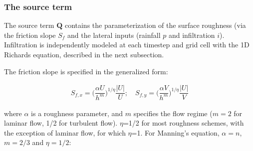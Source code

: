 \documentclass{article}
\newcommand{\code}[1]{\texttt{#1}}
\begin{document}

% 
%
%
%


\subsubsection*{The source term }

The source term $\mathbf{Q}$ contains the parameterization of the surface roughness (via the friction slope $S_f$  and the lateral inputs (rainfall $p$ and infiltration $i$).  Infiltration is independently modeled at each timestep and grid cell with the 1D Richards equation, described in the next subsection.
  
 The friction slope is specified in the generalized form: 

\begin{eqnarray} \nonumber
S_{f,x} = \bigg( \dfrac{\alpha  U}{h^m}\bigg)^{1/\eta} \dfrac{|U|}{U}; \quad
S_{f,y} = \bigg( \dfrac{\alpha  V}{h^m}\bigg)^{1/\eta} \dfrac{|U|}{V}
\end{eqnarray}

\noindent where $\alpha$ is a  roughness parameter, and $m$ specifies the flow regime ($m=2$ for laminar flow, 1/2 for turbulent flow).   $\eta$=1/2 for most roughness schemes, with the exception of laminar flow, for which $\eta$=1.  For Manning's equation, $\alpha = n$, $m=2/3$ and $\eta=1/2$:
\end{document}
